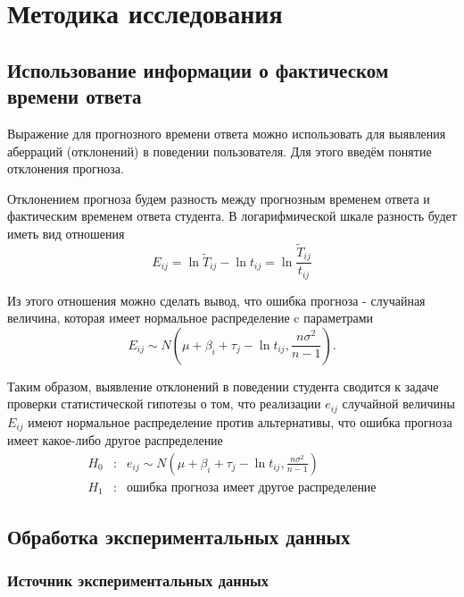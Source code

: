  \chapter{Методика исследования}

 \section{Использование информации о фактическом времени ответа}

Выражение для прогнозного времени ответа можно использовать для вы\-явления абер\-раций (отклонений) в поведении пользователя. Для этого введём понятие отклонения прогноза.

Отклонением прогноза будем разность между прогнозным временем ответа и фактичес\-ким временем ответа студента. В логарифмической шкале разность будет иметь вид отноше\-ния
\begin{equation}
E_{ij} = \ln \tilde{T}_{ij} - \ln t_{ij} =  \ln \frac{\tilde{T}_{ij}}{t_{ij}}
\end{equation}

Из этого отношения можно сделать вывод, что ошибка прогноза - случайная величина, которая имеет нормальное распределение c параметрами
\begin{equation}
E_{ij} \sim N\left(\mu + \beta_i + \tau_j - \ln t_{ij},\frac{n\sigma^2}{n-1}\right).
\end{equation}

Таким образом, выявление отклонений в поведении студента сводится к задаче проверки статистической гипотезы о том, что реализации $e_{ij}$ случайной величины $E_{ij}$ имеют нормаль\-ное распределение против альтернативы, что ошибка прогноза имеет какое-либо другое распреде\-ление
$$
\begin{array}{lll}
H_0 &:& e_{ij} \sim N\left(\mu + \beta_i + \tau_j - \ln t_{ij},\frac{n\sigma^2}{n-1}\right)\\
H_1 &:& \mbox{ошибка прогноза имеет другое распределение}
\end{array}
$$

\section{Обработка экспериментальных данных}

\subsection{Источник экспериментальных данных}

